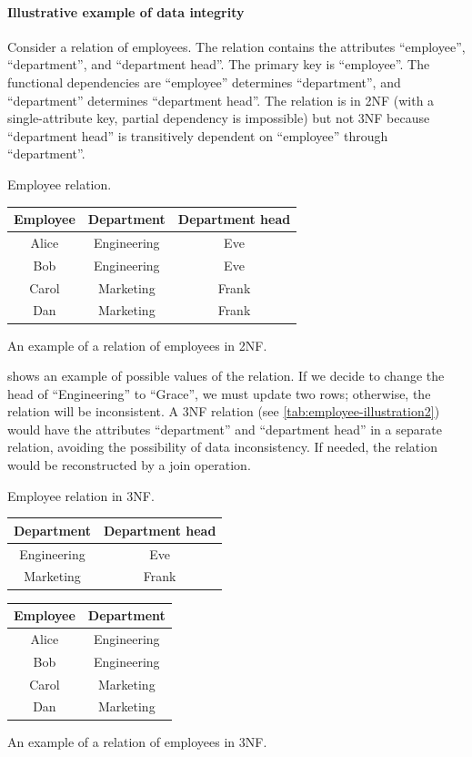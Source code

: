 \paragraph{Illustrative example of data integrity}  Consider a relation of employees.  The
relation contains the attributes ``employee'', ``department'', and ``department head''.
The primary key is ``employee''.  The functional dependencies are ``employee'' determines
``department'', and ``department'' determines ``department head''.  The relation is in 2NF
(with a single-attribute key, partial dependency is impossible) but not 3NF because
``department head'' is transitively dependent on ``employee'' through ``department''.

\begin{tablebox}[label=tab:employee-illustration]{Employee relation.}
  \centering
  \begin{tabular}{ccc}
    \toprule
    \textbf{Employee} & \textbf{Department} & \textbf{Department head} \\
    \midrule
    Alice & Engineering & Eve \\
    Bob & Engineering & Eve \\
    Carol & Marketing & Frank \\
    Dan & Marketing & Frank \\
    \bottomrule
  \end{tabular}
  \tcblower
  An example of a relation of employees in 2NF.
\end{tablebox}

 shows an example of possible values of the relation.
If we decide to change the head of ``Engineering'' to ``Grace'', we must update
two rows; otherwise, the relation will be inconsistent.  A 3NF relation (see
\cref{tab:employee-illustration2}) would have the attributes ``department'' and ``department
head'' in a separate relation, avoiding the possibility of data inconsistency.  If
needed, the relation would be reconstructed by a join operation.

\begin{tablebox}[label=tab:employee-illustration2]{Employee relation in 3NF.}
  \centering
  \begin{tabular}{cc}
    \toprule
    \textbf{Department} & \textbf{Department head} \\
    \midrule
    Engineering & Eve \\
    Marketing & Frank \\
    \bottomrule
  \end{tabular}
  \quad
  \begin{tabular}{cc}
    \toprule
    \textbf{Employee} & \textbf{Department} \\
    \midrule
    Alice & Engineering \\
    Bob & Engineering \\
    Carol & Marketing \\
    Dan & Marketing \\
    \bottomrule
  \end{tabular}
  \tcblower
  An example of a relation of employees in 3NF.
\end{tablebox}

